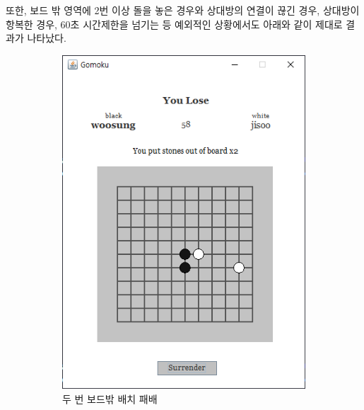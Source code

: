 \documentclass[a4paper, 10pt]{article}
\begin{document}
또한, 보드 밖 영역에 2번 이상 돌을 놓은 경우와 상대방의 연결이 끊긴 경우, 상대방이 항복한
경우, 60초 시간제한을 넘기는 등 예외적인 상황에서도 아래와 같이 제대로 결과가 나타났다.
\begin{figure}[h]
  \centering
  \begin{subfigure}{.24\textwidth}
    \centering
    \includegraphics[width=.9\linewidth]{resource/out_of_board2}
    \caption{두 번 보드밖 배치 패배}
    \label{fig:out_of_board2}
  \end{subfigure}
  \begin{subfigure}{.24\textwidth}
    \centering

\end{subfigure}
\end{figure}
\end{document}
